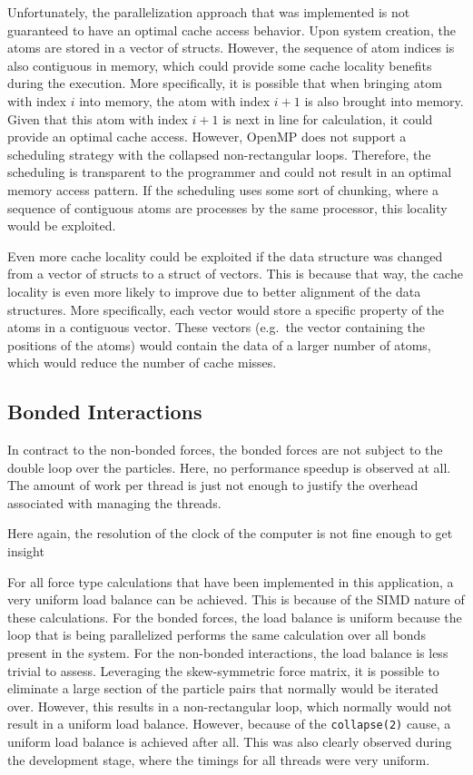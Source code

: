 \documentclass[conference]{IEEEtran}
\begin{document}
Unfortunately, the parallelization approach that was implemented is not guaranteed to have an optimal cache access behavior.
Upon system creation, the atoms are stored in a vector of structs. However, the sequence of atom indices is also 
contiguous in memory, which could provide some
cache locality benefits during the execution. More specifically, it is possible that when bringing atom with index
$i$ into memory, the atom with index $i+1$ is also brought into memory. Given that this atom with index $i+1$ is next
in line for calculation, it could provide an optimal cache access. However, OpenMP does not support a scheduling
strategy with the collapsed non-rectangular loops. Therefore, the scheduling is transparent to the programmer
and could not result in an optimal memory access pattern. If the scheduling uses some sort of chunking, where
a sequence of contiguous atoms are processes by the same processor, this locality would be exploited.

Even more cache locality could be exploited if the data structure was changed from a vector of structs to a struct 
of vectors. This is because that way, the cache locality is even more likely to improve due to better alignment of
the data structures. More specifically, each vector would store a specific property of the atoms in a contiguous vector.
These vectors (e.g.\ the vector containing the positions of the atoms) would contain the data of a larger number of
atoms, which would reduce the number of cache misses.

\subsection{Bonded Interactions}
In contract to the non-bonded forces, the bonded forces are not subject to the double loop over the particles. Here,
no performance speedup is observed at all. The amount of work per thread is just not enough to justify the overhead
associated with managing the threads. 

Here again, the resolution of the clock of the computer is not fine enough to get insight 

For all force type calculations that have been implemented in this application, a very uniform load balance can be
achieved. This is because of the SIMD nature of these calculations. For the bonded forces, the load balance is 
uniform because the loop that is being parallelized performs the same calculation over all bonds present in the
system. For the non-bonded interactions, the load balance is less trivial to assess. Leveraging the skew-symmetric
force matrix, it is possible to eliminate a large section of the particle pairs that normally would be iterated
over. However, this results in a non-rectangular loop, which normally would not result in a uniform load balance.
However, because of the \verb|collapse(2)| cause, a uniform load balance is achieved after all. This was also
clearly observed during the development stage, where the timings for all threads were very uniform.
\end{document}
